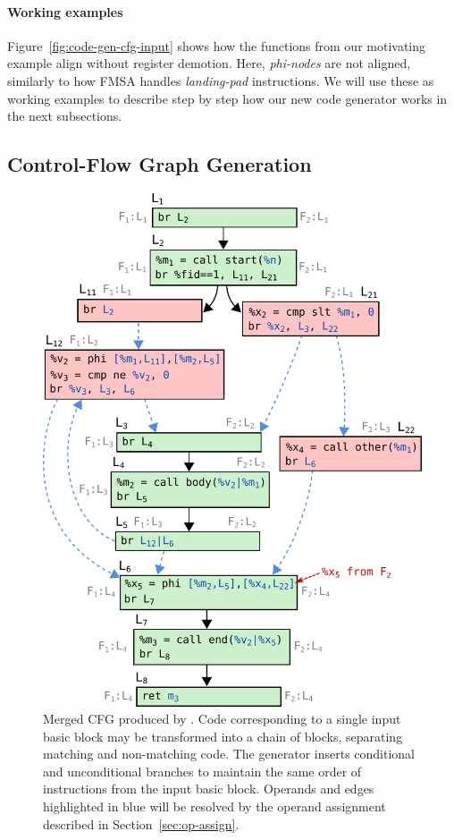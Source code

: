 \paragraph*{Working examples} Figure~\ref{fig:code-gen-cfg-input} shows how the functions from our motivating example align without register demotion.
Here, \textit{phi-nodes} are not aligned, similarly to how FMSA handles \textit{landing-pad} instructions. We will use these as working
examples to describe step by step how our new code generator works in the next subsections.


\subsection{Control-Flow Graph Generation} \label{sec:code-gen-core}

\begin{figure}[t!]
  \centering
  \includegraphics[scale=0.55]{src/merge-operation/figs/code-gen-cfg.pdf}
    \caption{Merged CFG produced by {\ProjName}. Code corresponding to a single
      input basic block may be transformed into a chain of blocks, separating
      matching and non-matching code. The generator inserts conditional and
      unconditional branches to maintain the same order of instructions
      from the input basic block. Operands and edges highlighted in blue will be
      resolved by the operand assignment described in Section~\ref{sec:op-assign}.}
  \label{fig:code-gen-cfg}
\end{figure}


